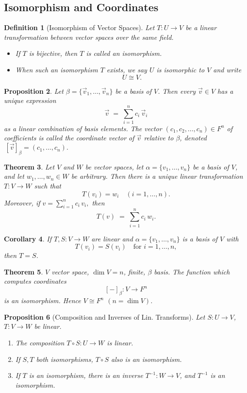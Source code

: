 \documentclass[12pt]{article}
\theoremstyle{break}             %
\newtheorem{thm}{Theorem}          %
\newtheorem{prop}[thm]{Proposition}%
\newtheorem{cor}[thm]{Corollary}
\newtheorem{defn}[thm]{Definition}
\begin{document}
\subsection{Isomorphism and Coordinates}

\begin{defn}[Isomorphism of Vector Spaces]
Let \(T:U\to V\) be a linear transformation between vector spaces over the same field.
\begin{itemize}
  \item If \(T\) is bijective, then \(T\) is called an \emph{isomorphism}.
  \item When such an isomorphism \(T\) exists, we say \(U\) is \emph{isomorphic} to \(V\) and write
    \[
      U \cong V.
    \]
\end{itemize}
\end{defn}

\begin{prop}
Let \(\beta = \{\vec{v}_1, \dots, \vec{v}_n\}\) be a basis of \(V\). Then every \(\vec{v} \in V\) has a 
\emph{unique} expression
\[
\vec{v} \;=\; \sum_{i=1}^n c_i \,\vec{v}_i
\]
as a linear combination of basis elements. The vector \((c_1, c_2, \dots, c_n) \in F^n\) of coefficients 
is called the \emph{coordinate vector} of \(\vec{v}\) relative to \(\beta\), denoted 
\(\,[\vec{v}]_\beta = (c_1, \dots, c_n).\)
\end{prop}

\begin{thm}
Let \(V\) and \(W\) be vector spaces, let \(\alpha = \{v_1,\dots,v_n\}\) be a basis of \(V\), and let \(w_1,\dots,w_n\in W\) be arbitrary.  Then there is a unique linear transformation \(T:V\to W\) such that
\[
T(v_i) = w_i\quad (i=1,\dots,n).
\]
Moreover, if 
\(\displaystyle v = \sum_{i=1}^n c_i\,v_i,\) 
then 
\[
T(v) \;=\; \sum_{i=1}^n c_i\,w_i.
\]
\end{thm}

\begin{cor}
If \(T,S:V\to W\) are linear and \(\alpha=\{v_1,\dots,v_n\}\) is a basis of \(V\) with
\[
T(v_i) = S(v_i)\quad\text{for }i=1,\dots,n,
\]
then \(T=S\).
\end{cor}

\begin{thm}
\(V\) vector space, \(\dim V = n\), finite, \(\beta\) basis.  
The function which computes coordinates 
\[
[-]_\beta : V \to F^n
\]
is an isomorphism. Hence \(V \cong F^n\) \quad \((n = \dim V)\).
\end{thm}

\begin{prop}[Composition and Inverses of Lin. Transforms]
Let \(S: U \to V\), \(T: V \to W\) be linear.
\begin{enumerate}
\item The composition \(T \circ S: U \to W\) is linear.
\item If \(S, T\) both isomorphisms, \(T \circ S\) also is an isomorphism.
\item If \(T\) is an isomorphism, there is an inverse \(T^{-1}: W \to V\), and \(T^{-1}\) is an isomorphism.
\end{enumerate}
\end{prop}
\end{document}
